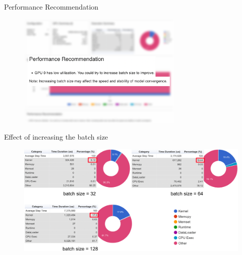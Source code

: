 \documentclass[compress,aspectratio=169]{beamer}
\begin{document}
\begin{frame}{Performance Recommendation}

\begin{center}
    \begin{figure}
        \includegraphics[width=0.7\textwidth]{../../data/scap_gtx1080_profiler-torch_14650076_zoom}
    \end{figure}
\end{center}

\end{frame}


\begin{frame}{Effect of increasing the batch size}
    \vspace{-0.5em}
\begin{center}
    \begin{figure}
        \includegraphics[width=1\textwidth]{../../data/scap_gtx1080_profiler-torch_comparison-batch-size}
    \end{figure}
    \end{center}

\end{frame}
\end{document}
